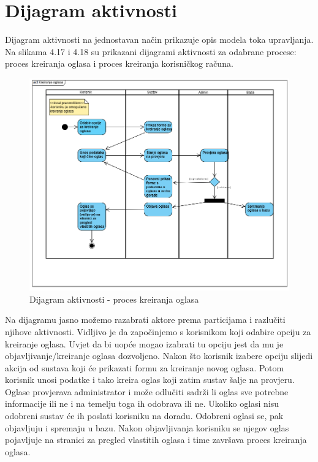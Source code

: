 				
				


		\section{Dijagram aktivnosti}

		Dijagram aktivnosti na jednostavan način prikazuje opis modela toka upravljanja. Na slikama 4.17 i 4.18 su prikazani dijagrami aktivnosti za odabrane procese: proces kreiranja oglasa i proces kreiranja korisničkog računa. \\
			

			 \begin{figure}[H]
                			\includegraphics[width=\textwidth,height=0.5\textheight]{dijagrami/DijagramAktivnosti1.png}%
				\centering
				\caption{Dijagram aktivnosti - proces kreiranja oglasa}
				\label{fig:ActivityDiagram1}
			\end{figure}

		Na dijagramu jasno možemo razabrati aktore prema particijama i razlučiti njihove aktivnosti. Vidljivo je da započinjemo s korisnikom koji odabire opciju za kreiranje oglasa. Uvjet da bi uopće mogao izabrati tu opciju jest da mu je objavljivanje/kreiranje oglasa dozvoljeno. Nakon što korisnik izabere opciju slijedi akcija od sustava koji će prikazati formu za kreiranje novog oglasa. Potom korisnik unosi podatke i tako kreira oglas koji zatim sustav šalje na provjeru. Oglase provjerava administrator i može odlučiti sadrži li oglas sve potrebne informacije ili ne i na temelju toga ih odobrava ili ne. Ukoliko oglasi nisu odobreni sustav će ih poslati korisniku na doradu. Odobreni oglasi se, pak objavljuju i spremaju u bazu. Nakon objavljivanja korisniku se njegov oglas pojavljuje na stranici za pregled vlastitih oglasa i time završava proces kreiranja oglasa. \\
			\eject


